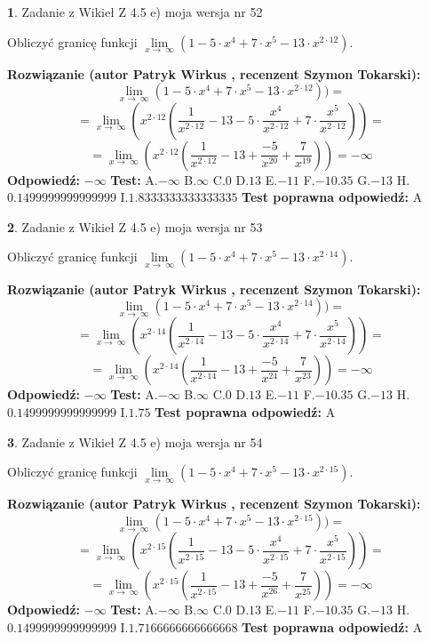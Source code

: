 \documentclass[12pt, a4paper]{article}
\theoremstyle{definition} %
\newtheorem{zad}{}
\newcommand{\zadStart}[1]{\begin{zad}#1\newline}
\newcommand{\zadStop}{\end{zad}}
\newcommand{\rozwStart}[2]{\noindent \textbf{Rozwiązanie (autor #1 , recenzent #2): }\newline}
\newcommand{\rozwStop}{\newline}
\newcommand{\odpStart}{\noindent \textbf{Odpowiedź:}\newline}
\newcommand{\odpStop}{\newline}
\newcommand{\testStart}{\noindent \textbf{Test:}\newline}
\newcommand{\testStop}{\newline}
\newcommand{\kluczStart}{\noindent \textbf{Test poprawna odpowiedź:}\newline}
\newcommand{\kluczStop}{\newline}
\begin{document}
\zadStart{Zadanie z Wikieł Z 4.5 e) moja wersja nr 52}


Obliczyć granicę funkcji  $\lim\limits_{x\to\ \infty}(1 - 5 \cdot x^{4}+7 \cdot x^{5}- 13 \cdot x^{2\cdot12})$.
\zadStop
\rozwStart{Patryk Wirkus}{Szymon Tokarski}
$$\lim\limits_{x\to\ \infty}(1 - 5 \cdot x^{4}+7 \cdot x^{5}- 13 \cdot x^{2\cdot12}))=$$
$$=\lim\limits_{x\to\ \infty}(x^{2\cdot12}(\frac{1}{x^{2\cdot12}}-13 -5 \cdot \frac{x^{4}}{x^{2\cdot12}}+7 \cdot \frac{x^{5}}{x^{2\cdot12}}))=$$
$$=\lim\limits_{x\to\ \infty}(x^{2\cdot12}(\frac{1}{x^{2\cdot12}}-13 + \frac{-5}{x^{20}}+ \frac{7}{x^{19}}))=-\infty$$
\rozwStop
\odpStart
$-\infty$
\odpStop
\testStart
A.$-\infty$ B.$\infty$ C.$0$ D.$13$ E.$-11$
F.$-10.35$ G.$-13$
H.$0.1499999999999999$
I.$1.8333333333333335$
\testStop
\kluczStart
A
\kluczStop



\zadStart{Zadanie z Wikieł Z 4.5 e) moja wersja nr 53}


Obliczyć granicę funkcji  $\lim\limits_{x\to\ \infty}(1 - 5 \cdot x^{4}+7 \cdot x^{5}- 13 \cdot x^{2\cdot14})$.
\zadStop
\rozwStart{Patryk Wirkus}{Szymon Tokarski}
$$\lim\limits_{x\to\ \infty}(1 - 5 \cdot x^{4}+7 \cdot x^{5}- 13 \cdot x^{2\cdot14}))=$$
$$=\lim\limits_{x\to\ \infty}(x^{2\cdot14}(\frac{1}{x^{2\cdot14}}-13 -5 \cdot \frac{x^{4}}{x^{2\cdot14}}+7 \cdot \frac{x^{5}}{x^{2\cdot14}}))=$$
$$=\lim\limits_{x\to\ \infty}(x^{2\cdot14}(\frac{1}{x^{2\cdot14}}-13 + \frac{-5}{x^{24}}+ \frac{7}{x^{23}}))=-\infty$$
\rozwStop
\odpStart
$-\infty$
\odpStop
\testStart
A.$-\infty$ B.$\infty$ C.$0$ D.$13$ E.$-11$
F.$-10.35$ G.$-13$
H.$0.1499999999999999$
I.$1.75$
\testStop
\kluczStart
A
\kluczStop



\zadStart{Zadanie z Wikieł Z 4.5 e) moja wersja nr 54}


Obliczyć granicę funkcji  $\lim\limits_{x\to\ \infty}(1 - 5 \cdot x^{4}+7 \cdot x^{5}- 13 \cdot x^{2\cdot15})$.
\zadStop
\rozwStart{Patryk Wirkus}{Szymon Tokarski}
$$\lim\limits_{x\to\ \infty}(1 - 5 \cdot x^{4}+7 \cdot x^{5}- 13 \cdot x^{2\cdot15}))=$$
$$=\lim\limits_{x\to\ \infty}(x^{2\cdot15}(\frac{1}{x^{2\cdot15}}-13 -5 \cdot \frac{x^{4}}{x^{2\cdot15}}+7 \cdot \frac{x^{5}}{x^{2\cdot15}}))=$$
$$=\lim\limits_{x\to\ \infty}(x^{2\cdot15}(\frac{1}{x^{2\cdot15}}-13 + \frac{-5}{x^{26}}+ \frac{7}{x^{25}}))=-\infty$$
\rozwStop
\odpStart
$-\infty$
\odpStop
\testStart
A.$-\infty$ B.$\infty$ C.$0$ D.$13$ E.$-11$
F.$-10.35$ G.$-13$
H.$0.1499999999999999$
I.$1.7166666666666668$
\testStop
\kluczStart
A
\kluczStop
\end{document}
